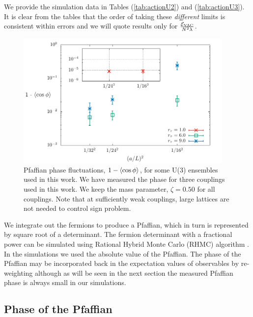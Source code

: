 We provide the simulation data in Tables (\ref{tab:actionU2}) and (\ref{tab:actionU3}). It is clear from the tables that the order of taking these \emph{different} limits is consistent within errors and we will quote results only for $\frac{\mathcal{E}_{\mathrm{VAC}}}{N^2 \lambda}$.
\begin{figure}[htb]
\begin{center} 
\includegraphics[width=0.95\textwidth]{Figures/2dq4_sign.pdf}
\end{center}
\caption{\label{fig:pfaffian1}Pfaffian phase fluctuations, $1 - \left\langle \cos\phi \right\rangle$, for some U(3) ensembles used in this work. We have measured the phase for three couplings used in this work. We keep the mass parameter, $\zeta = 0.50$ for all couplings. Note that at sufficiently weak couplings, large lattices are not needed to control sign problem.}
\end{figure}
We integrate out the fermions to produce a Pfaffian, which in turn is represented by square root of a determinant. The fermion determinant with a fractional power can be simulated using Rational Hybrid Monte Carlo (RHMC) algorithm \cite{Clark:2004cp}. In the simulations we used the absolute value of the Pfaffian. The phase of the Pfaffian may be incorporated back in the expectation values of observables by re-weighting although as will be seen in the next section the measured Pfaffian phase is always small in our simulations.

\subsection{Phase of the Pfaffian}
\label{sec:pfaf} 

